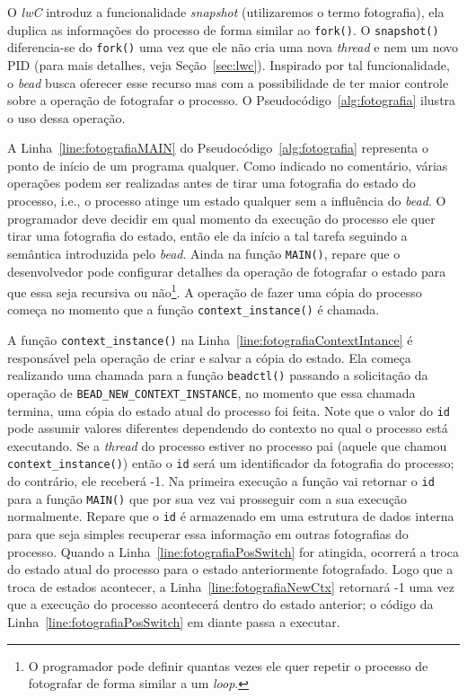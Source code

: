 O \emph{lwC} introduz a funcionalidade \emph{snapshot} (utilizaremos o termo
fotografia), ela duplica as informações do processo de forma
similar ao \texttt{fork()}. O \texttt{snapshot()} diferencia-se do
\texttt{fork()} uma vez que ele não cria uma nova \emph{thread} e nem um novo PID
(para mais detalhes, veja Seção~\ref{sec:lwc}). Inspirado por tal
funcionalidade, o \emph{bead} busca oferecer esse recurso mas com a
possibilidade de ter maior controle sobre a operação de fotografar o processo.
O Pseudocódigo~\ref{alg:fotografia} ilustra o uso dessa operação.



A Linha~\ref{line:fotografiaMAIN} do Pseudocódigo~\ref{alg:fotografia}
representa o ponto de início de um programa qualquer. Como indicado no
comentário, várias operações podem ser realizadas antes de tirar uma fotografia
do estado do processo, i.e., o processo atinge um estado qualquer sem a
influência do \emph{bead}. O programador deve decidir em qual momento da execução do
processo ele quer tirar uma fotografia do estado, então ele da início a tal
tarefa seguindo a semântica introduzida pelo \emph{bead}. Ainda na função
\texttt{MAIN()}, repare que o desenvolvedor pode configurar detalhes da
operação de fotografar o estado para que essa seja recursiva ou não\footnote{O
programador pode definir quantas vezes ele quer repetir o processo de
fotografar de forma similar a um \emph{loop}.}. A operação de fazer uma cópia
do processo começa no momento que a função \texttt{context\_instance()} é
chamada.

A função \texttt{context\_instance()} na
Linha~\ref{line:fotografiaContextIntance} é responsável pela operação de criar
e salvar a cópia do estado. Ela começa realizando uma chamada para a função
\texttt{beadctl()} passando a solicitação da operação de
\texttt{BEAD\_NEW\_CONTEXT\_INSTANCE}, no momento que essa chamada termina, uma
cópia do estado atual do processo foi feita. Note que o valor do \texttt{id}
pode assumir valores diferentes dependendo do contexto no qual o processo está
executando. Se a \emph{thread} do processo estiver no processo pai (aquele que
chamou \texttt{context\_instance()}) então o \texttt{id} será um identificador
da fotografia do processo; do contrário, ele receberá -1. Na primeira execução
a função vai retornar o \texttt{id} para a função \texttt{MAIN()} que por sua
vez vai prosseguir com a sua execução normalmente. Repare que o \texttt{id} é
armazenado em uma estrutura de dados interna para que seja simples recuperar
essa informação em outras fotografias do processo. Quando a
Linha~\ref{line:fotografiaPosSwitch} for atingida, ocorrerá a troca do estado
atual do processo para o estado anteriormente fotografado. Logo que a troca de
estados acontecer, a Linha~\ref{line:fotografiaNewCtx} retornará -1 uma vez que
a execução do processo acontecerá dentro do estado anterior; o código da
Linha~\ref{line:fotografiaPosSwitch} em diante passa a executar.

